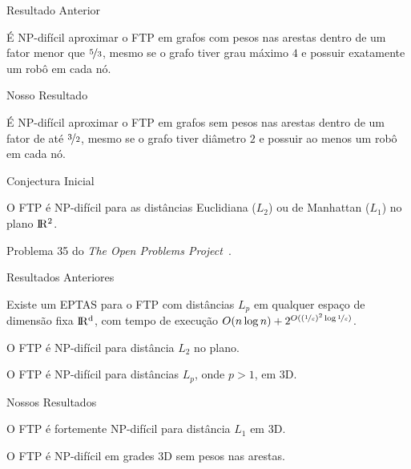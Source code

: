 \begin{frame}{Resultado Anterior}
  \begin{thm}
    É NP-difícil aproximar o FTP em grafos com pesos nas arestas dentro de um fator menor que $\nicefrac{5}{3}$, mesmo se o grafo tiver grau máximo $4$ e possuir exatamente um robô em cada nó.
  \end{thm}
\end{frame}

\begin{frame}{Nosso Resultado}
  \begin{thm}
    É NP-difícil aproximar o FTP em grafos sem pesos nas arestas dentro de um fator de até $\nicefrac{3}{2}$, mesmo se o grafo tiver diâmetro $2$ e possuir ao menos um robô em cada nó.
  \end{thm}
\end{frame}

\begin{frame}{Conjectura Inicial}
  \begin{conj}
    O FTP é NP-difícil para as distâncias Euclidiana ($L_2$) ou de Manhattan ($L_1$) no plano $\rm I\!R^2$.
  \end{conj}

  \pause
  Problema 35 do \emph{The Open Problems Project}~\cite{TOPP}.
\end{frame}

\begin{frame}{Resultados Anteriores}
  \begin{thm}
    Existe um EPTAS para o FTP com distâncias $L_p$ em qualquer espaço de dimensão fixa $\rm I\!R^d$, com tempo de execução $O(n \log n) + 2^{O((\nicefrac{1}{\varepsilon})^2\log{\nicefrac{1}{\varepsilon}})}$.
  \end{thm}

  \pause
  \begin{thm}
    O FTP é NP-difícil para distância $L_2$ no plano.
  \end{thm}

  \pause
  \begin{thm}
    O FTP é NP-difícil para distâncias $L_p$, onde $p>1$, em 3D.
  \end{thm}
\end{frame}

\begin{frame}{Nossos Resultados}
  \begin{thm}
    O FTP é fortemente NP-difícil para distância $L_1$ em 3D.
  \end{thm}

  \pause
  \begin{cor}
    O FTP é NP-difícil em grades 3D sem pesos nas arestas.
  \end{cor}
\end{frame}

